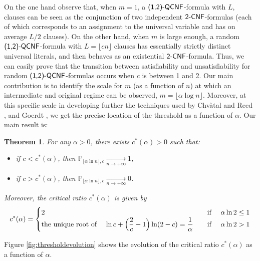 \documentclass[aop,noinfoline]{imsart}
\newtheorem{theorem}{Theorem}[section]
\newcommand{\onetwo}{(1,2)}
\newcommand{\onetwoqcnf}{\mbox{\sf \onetwo-QCNF}}
\newcommand{\twocnf}{\mbox{\sf 2-CNF}}
\begin{document}
On the one hand observe that, when $m=1$, a $\onetwoqcnf$-formula
with $L$, clauses can   be seen as the conjunction of 
two independent $\twocnf$-formulas (each of which corresponds to an
assignment to the universal variable  and has on average $L/2$
clauses).  On the other hand,   when $m$ is large enough, a random
$\onetwoqcnf$-formula with  $ L=\lfloor cn\rfloor$ clauses has
essentially strictly distinct universal literals, and then behaves
as an existential $\twocnf$-formula. Thus,  we can easily prove
that the transition between satisfiability and unsatisfiability
for  random  $\onetwoqcnf$-formulas occurs when $c$ is  between 1
and 2.  Our main contribution is to identify the scale for $m$ (as
a function of $n$) at which an  intermediate and original regime
can be observed, $m=\lfloor \alpha \log n\rfloor$. Moreover,  at
this specific scale in developing further the techniques used by
Chv\`atal and Reed  \cite{ChvatalR-92}, and Goerdt
\cite{Goerdt-96},  we get the precise location of the threshold as
a function of $\alpha$.  Our main result is:



\begin{theorem}\label{thm:main}
 For any $\alpha >0$,
 there exists  $c^{*}(\alpha)>0$  such that:

  \begin{itemize}
  \item if $c<c^{*}(\alpha)$, then $\mathbb{P}_{\lfloor\alpha \ln n\rfloor,c}
\xrightarrow[n\rightarrow
    +\infty]{}
    1$, \\
  \item if $c>c^{*}(\alpha)$, then $\mathbb{P}_{\lfloor\alpha \ln n\rfloor,c}
\xrightarrow[n\rightarrow
    +\infty]{}
    0$. \\
  \end{itemize}
  Moreover, the critical ratio $c^{*}(\alpha)$   is given by 
   $$
c^{*}(\alpha) =
  \begin{cases}
  2     &
  \quad \text{if \quad $ \alpha \ln 2\leq 1$} \\
 \text{the unique root of  \quad $\displaystyle  \ln c+ \Bigl(
\frac{2}{c}-1\Bigr ) \ln(2-c) = \frac{1}{\alpha}$} &
  \quad \text{if \quad $ \alpha \ln 2>1$} \\
  \end{cases}
$$



\end{theorem}

 Figure \ref{fig:thresholdevolution} shows the evolution of the critical ratio
$c^{*}(\alpha)$ as a function of $\alpha$. 
\end{document}
